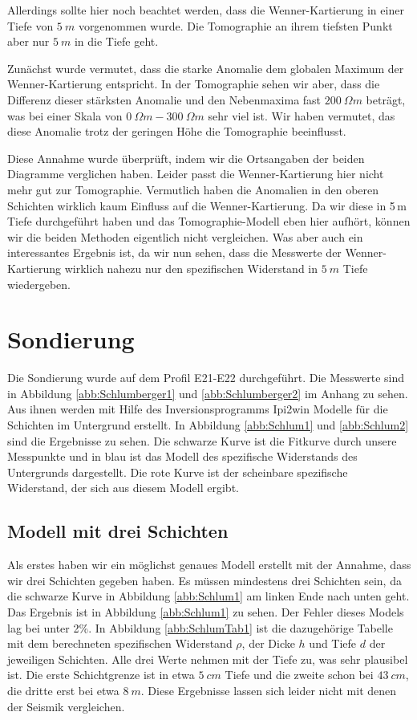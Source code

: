 Allerdings sollte hier noch beachtet werden, dass die Wenner-Kartierung in einer Tiefe von $\SI{5}{m}$ vorgenommen wurde. Die Tomographie an ihrem tiefsten Punkt aber nur $\SI{5}{m}$ in die Tiefe geht. 

Zunächst wurde vermutet, dass die starke Anomalie dem globalen Maximum der Wenner-Kartierung entspricht. In der Tomographie sehen wir aber, dass die Differenz dieser stärksten Anomalie und den Nebenmaxima fast $\SI{200}{\Omega m}$ beträgt, was bei einer Skala von $\SI{0}{\Omega m}- \SI{300}{\Omega m}$ sehr viel ist. Wir haben vermutet, das diese Anomalie trotz der geringen Höhe die Tomographie beeinflusst.

Diese Annahme wurde überprüft, indem wir die Ortsangaben der beiden Diagramme verglichen haben. Leider passt die Wenner-Kartierung hier nicht mehr gut zur Tomographie. Vermutlich haben die Anomalien in den oberen Schichten wirklich kaum Einfluss auf die Wenner-Kartierung. Da wir diese in 5\,m Tiefe durchgeführt haben und das Tomographie-Modell eben hier aufhört, können wir die beiden Methoden eigentlich nicht vergleichen. Was aber auch ein interessantes Ergebnis ist, da wir nun sehen, dass die Messwerte der Wenner-Kartierung wirklich nahezu nur den spezifischen Widerstand in $\SI{5}{m}$ Tiefe wiedergeben.

\section{Sondierung}

Die Sondierung wurde auf dem Profil E21-E22 durchgeführt. Die Messwerte sind in Abbildung \ref{abb:Schlumberger1} und \ref{abb:Schlumberger2} im Anhang zu sehen. Aus ihnen werden mit Hilfe des Inversionsprogramms Ipi2win Modelle für die Schichten im Untergrund erstellt.
In Abbildung \ref{abb:Schlum1} und \ref{abb:Schlum2} sind die Ergebnisse zu sehen. Die schwarze Kurve ist die Fitkurve durch unsere Messpunkte und in blau ist das Modell des spezifische Widerstands des Untergrunds dargestellt. Die rote Kurve ist der scheinbare spezifische Widerstand, der sich aus diesem Modell ergibt.

\subsection{Modell mit drei Schichten}

Als erstes haben wir ein möglichst genaues Modell erstellt mit der Annahme, dass wir drei Schichten gegeben haben. Es müssen mindestens drei Schichten sein, da die schwarze Kurve in Abbildung \ref{abb:Schlum1} am linken Ende nach unten geht. Das Ergebnis ist in Abbildung \ref{abb:Schlum1} zu sehen. Der Fehler dieses Models lag bei unter 2\%. In Abbildung \ref{abb:SchlumTab1} ist die dazugehörige Tabelle mit dem berechneten spezifischen Widerstand $\rho$, der Dicke $h$ und Tiefe $d$ der jeweiligen Schichten.  Alle drei Werte nehmen mit der Tiefe zu, was sehr plausibel ist. Die erste Schichtgrenze ist in etwa $\SI{5}{cm}$ Tiefe und die zweite schon bei $\SI{43}{cm}$, die dritte erst bei etwa $\SI{8}{m}$. Diese Ergebnisse lassen sich leider nicht mit denen der Seismik vergleichen. 

